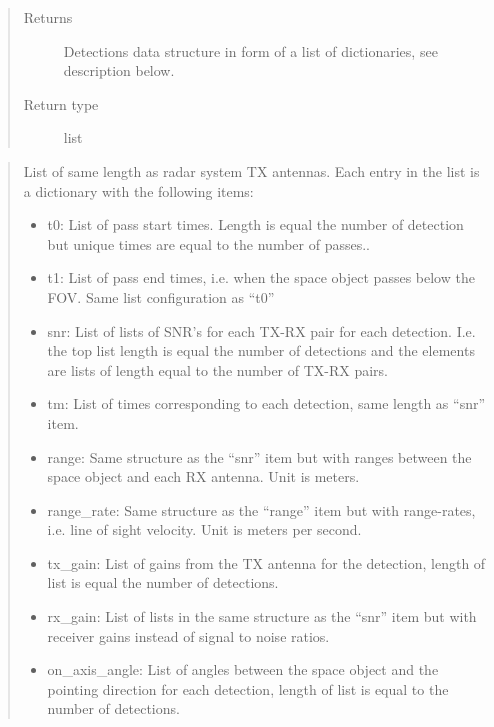 \documentclass[letterpaper,10pt,english]{sphinxmanual}
\begin{document}
\begin{fulllineitems}
\begin{quote}
\begin{description}
\begin{itemize}
\end{itemize}

\item[{Returns}] \leavevmode
Detections data structure in form of a list of dictionaries, see description below.

\item[{Return type}] \leavevmode
list

\end{description}\end{quote}

\begin{quote}

List of same length as radar system TX antennas. Each entry in the list is a dictionary with the following items:
\begin{itemize}
\item {} 
t0: List of pass start times. Length is equal the number of detection but unique times are equal to the number of passes..

\item {} 
t1: List of pass end times, i.e. when the space object passes below the FOV. Same list configuration as “t0”

\item {} 
snr: List of lists of SNR’s for each TX-RX pair for each detection. I.e. the top list length is equal the number of detections and the elements are lists of length equal to the number of TX-RX pairs.

\item {} 
tm: List of times corresponding to each detection, same length as “snr” item.

\item {} 
range: Same structure as the “snr” item but with ranges between the space object and each RX antenna. Unit is meters.

\item {} 
range\_rate: Same structure as the “range” item but with range-rates, i.e. line of sight velocity. Unit is meters per second.

\item {} 
tx\_gain: List of gains from the TX antenna for the detection, length of list is equal the number of detections.

\item {} 
rx\_gain: List of lists in the same structure as the “snr” item but with receiver gains instead of signal to noise ratios.

\item {} 
on\_axis\_angle: List of angles between the space object and the pointing direction for each detection, length of list is equal to the number of detections.

\end{itemize}
\end{quote}

\end{fulllineitems}
\end{document}
